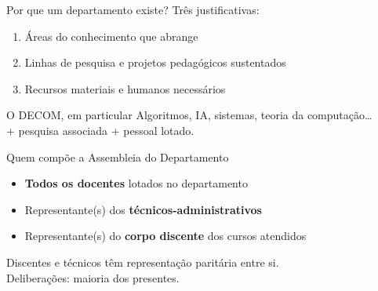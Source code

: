 \documentclass[aspectratio=169]{beamer}
\newcommand{\impt}[1]{\textcolor{maccent}{\textbf{#1}}}
\newcommand{\ntc}[1]{\textcolor{mprimary}{#1}}
\begin{document}
\begin{frame}{Por que um departamento existe?}
  Três justificativas:
  \begin{enumerate}
    \item Áreas do conhecimento que abrange
    \item Linhas de pesquisa e projetos pedagógicos sustentados
    \item Recursos materiais e humanos necessários
  \end{enumerate}

  \vspace{0.4cm}

  \begin{block}{O DECOM, em particular}
    Algoritmos, IA, sistemas, teoria da computação\ldots\\
    + pesquisa associada + pessoal lotado.
  \end{block}
\end{frame}

\begin{frame}{Quem compõe a Assembleia do Departamento}
  \begin{itemize}
    \item \impt{Todos os docentes} lotados no departamento
    \item Representante(s) dos \impt{técnicos-administrativos}
    \item Representante(s) do \impt{corpo discente} dos cursos atendidos
  \end{itemize}

  \vspace{0.4cm}

  \ntc{Discentes e técnicos têm representação paritária entre si.}\\
  \ntc{Deliberações: maioria dos presentes.}
\end{frame}
\end{document}
